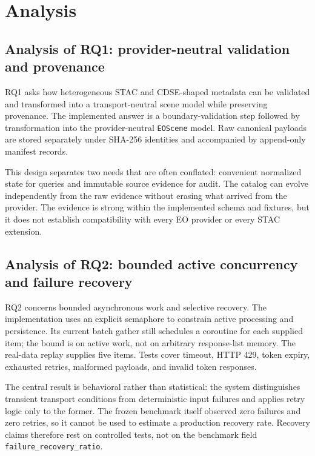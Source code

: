 \chapter{Analysis}

\section{Analysis of RQ1: provider-neutral validation and provenance}

RQ1 asks how heterogeneous STAC and CDSE-shaped metadata can be validated and transformed into a transport-neutral scene model while preserving provenance. The implemented answer is a boundary-validation step followed by transformation into the provider-neutral \texttt{EOScene} model. Raw canonical payloads are stored separately under SHA-256 identities and accompanied by append-only manifest records.

This design separates two needs that are often conflated: convenient normalized state for queries and immutable source evidence for audit. The catalog can evolve independently from the raw evidence without erasing what arrived from the provider. The evidence is strong within the implemented schema and fixtures, but it does not establish compatibility with every EO provider or every STAC extension.

\section{Analysis of RQ2: bounded active concurrency and failure recovery}

RQ2 concerns bounded asynchronous work and selective recovery. The implementation uses an explicit semaphore to constrain active processing and persistence.
Its current batch gather still schedules a coroutine for each supplied item; the bound is on
active work, not on arbitrary response-list memory. The real-data replay supplies five items. Tests cover timeout, HTTP 429, token expiry, exhausted retries, malformed payloads, and invalid token responses.

The central result is behavioral rather than statistical: the system distinguishes transient transport conditions from deterministic input failures and applies retry logic only to the former. The frozen benchmark itself observed zero failures and zero retries, so it cannot be used to estimate a production recovery rate. Recovery claims therefore rest on controlled tests, not on the benchmark field \texttt{failure\_recovery\_ratio}.

